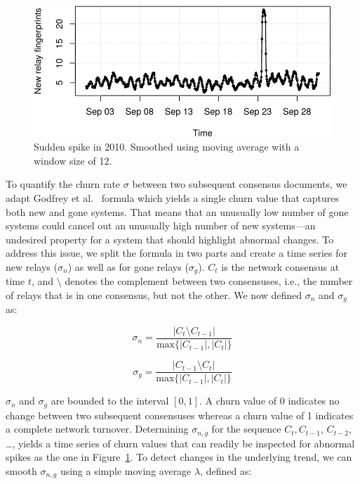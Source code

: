 \begin{figure}[t]
	\centering
	\includegraphics[width=\linewidth]{diagrams/sudden-spike.pdf}
	\caption{Sudden spike in 2010.  Smoothed using moving average with a window
	size of 12.}
	\label{fig:sudden-spike}
\end{figure}

To quantify the churn rate $\sigma$ between two subsequent consensus documents,
we adapt Godfrey et al.~\cite{Godfrey2006a} formula which yields a single churn
value that captures both new and gone systems.  That means that an unusually low
number of gone systems could cancel out an unusually high number of new
systems---an undesired property for a system that should highlight abnormal
changes.  To address this issue, we split the formula in two parts and create a
time series for new relays ($\sigma_{n}$) as well as for gone relays
($\sigma_{g}$).  $C_{t}$ is the network consensus at time $t$, and $\setminus$
denotes the complement between two consensuses, i.e., the number of relays that
is in one consensus, but not the other.  We now defined $\sigma_{n}$ and
$\sigma_{g}$ as:

\begin{equation}
\sigma_{n} = \frac{\lvert C_{t} \setminus C_{t-1} \rvert}
{\textrm{max}\{\lvert C_{t-1} \rvert, \lvert C_{t} \rvert \}}
\end{equation}

\begin{equation}
\sigma_{g} = \frac{\lvert C_{t-1} \setminus C_{t} \rvert}
{\textrm{max}\{\lvert C_{t-1} \rvert, \lvert C_{t} \rvert \}}
\end{equation}

$\sigma_{n}$ and $\sigma_{g}$ are bounded to the interval $[0, 1]$.  A churn
value of 0 indicates no change between two subsequent consensuses whereas a
churn value of 1 indicates a complete network turnover.  Determining
$\sigma_{n,g}$ for the sequence $C_{t}, C_{t-1}$, $C_{t-2}$, \ldots, yields a
time series of churn values that can readily be inspected for abnormal spikes as
the one in Figure~\ref{fig:sudden-spike}.  To detect changes in the underlying
trend, we can smooth $\sigma_{n,g}$ using a simple moving average $\lambda$,
defined as:

